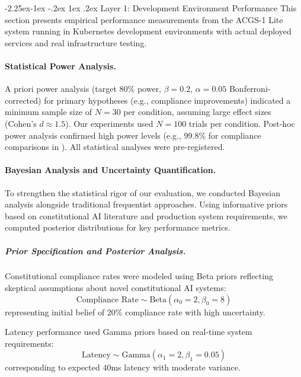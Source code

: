 \documentclass[manuscript,screen,9pt]{acmart}
\makeatletter
\renewcommand\subsection{\@startsection{subsection}{2}{\z@}%
  {-2.25ex\@plus -1ex \@minus -.2ex}%
  {1ex \@plus .2ex}%
  {\normalfont\large\bfseries}}
\makeatother
\begin{document}
\subsection{Layer 1: Development Environment Performance}
\label{subsec:development_performance}
This section presents empirical performance measurements from the ACGS-1 Lite system running in Kubernetes development environments with actual deployed services and real infrastructure testing.

\paragraph{Statistical Power Analysis.}
\label{subsec:power_analysis}
A priori power analysis (target 80\% power, $\beta = 0.2$, $\alpha = 0.05$ Bonferroni-corrected) for primary hypotheses (e.g., compliance improvements) indicated a minimum sample size of $N=30$ per condition, assuming large effect sizes (Cohen's $d \approx 1.5$). Our experiments used $N=100$ trials per condition. Post-hoc power analysis confirmed high power levels (e.g., 99.8\% for compliance comparisons in ). All statistical analyses were pre-registered.

\paragraph{Bayesian Analysis and Uncertainty Quantification.}
\label{subsec:bayesian_analysis}
To strengthen the statistical rigor of our evaluation, we conducted Bayesian analysis alongside traditional frequentist approaches. Using informative priors based on constitutional AI literature and production system requirements, we computed posterior distributions for key performance metrics.

\subparagraph{Prior Specification and Posterior Analysis.}
Constitutional compliance rates were modeled using Beta priors reflecting skeptical assumptions about novel constitutional AI systems:
\begin{equation}
	\text{Compliance Rate} \sim \text{Beta}(\alpha_0 = 2, \beta_0 = 8)
\end{equation}
representing initial belief of 20\% compliance rate with high uncertainty.

Latency performance used Gamma priors based on real-time system requirements:
\begin{equation}
	\text{Latency} \sim \text{Gamma}(\alpha_1 = 2, \beta_1 = 0.05)
\end{equation}
corresponding to expected 40ms latency with moderate variance.
\end{document}
